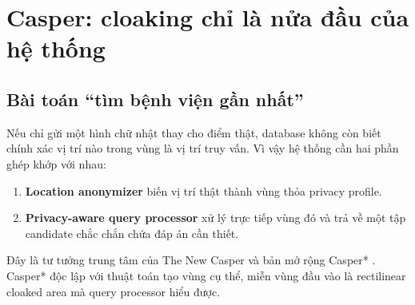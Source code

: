 \documentclass[11pt,a4paper,oneside]{report}
\begin{document}
\chapter{Casper: cloaking chỉ là nửa đầu của hệ thống}

\section{Bài toán ``tìm bệnh viện gần nhất''}

Nếu chỉ gửi một hình chữ nhật thay cho điểm thật, database không còn biết chính
xác vị trí nào trong vùng là vị trí truy vấn. Vì vậy hệ thống cần hai phần ghép
khớp với nhau:

\begin{enumerate}
  \item \textbf{Location anonymizer} biến vị trí thật thành vùng thỏa privacy profile.
  \item \textbf{Privacy-aware query processor} xử lý trực tiếp vùng đó và trả về một
  tập candidate chắc chắn chứa đáp án cần thiết.
\end{enumerate}

Đây là tư tưởng trung tâm của The New Casper và bản mở rộng Casper*
\cite{mokbel2006casper,chow2009casper}. Casper* độc lập với thuật toán tạo vùng cụ
thể, miễn vùng đầu vào là rectilinear cloaked area mà query processor hiểu được.
\end{document}
